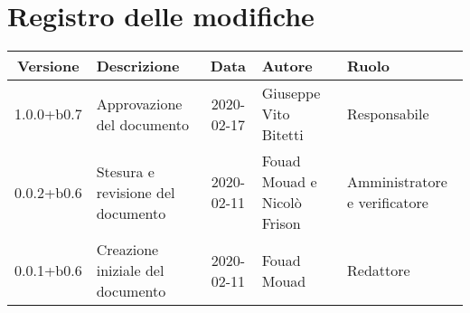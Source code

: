 \section*{Registro delle modifiche}

\begin{center}
	\begin{longtable}{|c|p{3.5cm}|c|p{3cm}|p{3cm}|}
	\hline
	\rowcolor{lighter-grayer}
	\textbf{Versione} & \textbf{Descrizione} & \textbf{Data} & \textbf{Autore} & \textbf{Ruolo} \\
	\hline
	\endfirsthead


	1.0.0+b0.7 & Approvazione del documento & 2020-02-17 & Giuseppe Vito Bitetti & Responsabile \\
	\hline
	0.0.2+b0.6 & Stesura e revisione del documento & 2020-02-11 & Fouad Mouad e Nicolò Frison & Amministratore e verificatore \\
	\hline
	0.0.1+b0.6 & Creazione iniziale del documento & 2020-02-11 & Fouad Mouad & Redattore \\
	\hline

	\end{longtable}
\end{center}